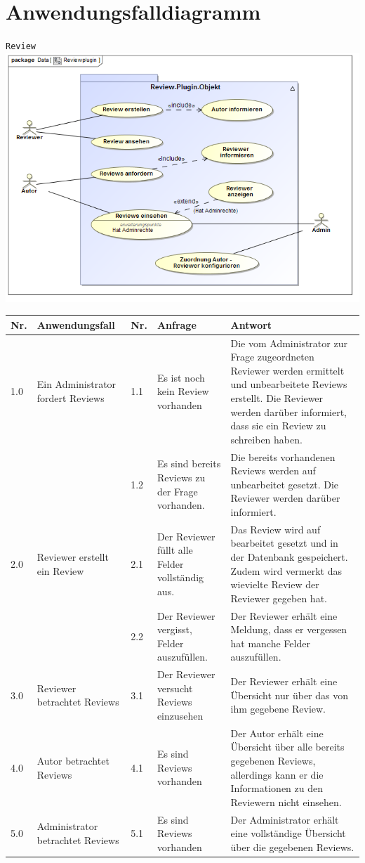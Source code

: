 \documentclass[a4paper]{scrreprt}
\begin{document}
\section{Anwendungsfalldiagramm}
\texttt{Review}\\

\includegraphics[width=1.0\textwidth]{Use_Case_Diagram__Reviewplugin.png}
\label{Review}

\begin{tabular}{|p{0.5cm}|p{3cm}|p{0.5cm}|p{4cm}|p{4.5cm}|}\hline
Nr. & Anwendungsfall & Nr. & Anfrage & Antwort\\\hline
1.0 & Ein Administrator fordert Reviews & 1.1 & Es ist noch kein Review vorhanden & Die vom Administrator zur Frage zugeordneten Reviewer werden ermittelt und unbearbeitete Reviews erstellt. Die Reviewer werden darüber informiert, dass sie ein Review zu schreiben haben.\\\hline
&&1.2 & Es sind bereits Reviews zu der Frage vorhanden. & Die bereits vorhandenen Reviews werden auf unbearbeitet gesetzt. Die Reviewer werden darüber informiert.\\\hline
2.0 & Reviewer erstellt ein Review & 2.1 & Der Reviewer füllt alle Felder vollständig aus. & Das Review wird auf bearbeitet gesetzt und in der Datenbank gespeichert. Zudem wird vermerkt das wievielte Review der Reviewer gegeben hat.\\\hline
&&2.2 & Der Reviewer vergisst, Felder auszufüllen. & Der Reviewer erhält eine Meldung, dass er vergessen hat manche Felder auszufüllen. \\\hline
3.0 & Reviewer betrachtet Reviews & 3.1 & Der Reviewer versucht Reviews einzusehen & Der Reviewer erhält eine Übersicht nur über das von ihm gegebene Review. \\\hline
4.0 & Autor betrachtet Reviews & 4.1 & Es sind Reviews vorhanden & Der Autor erhält eine Übersicht über alle bereits gegebenen Reviews, allerdings kann er die Informationen zu den Reviewern nicht einsehen. \\\hline
5.0 & Administrator betrachtet Reviews & 5.1 & Es sind Reviews vorhanden & Der Administrator erhält eine vollständige Übersicht über die gegebenen Reviews. \\\hline
\end{tabular}
 
\end{document}
